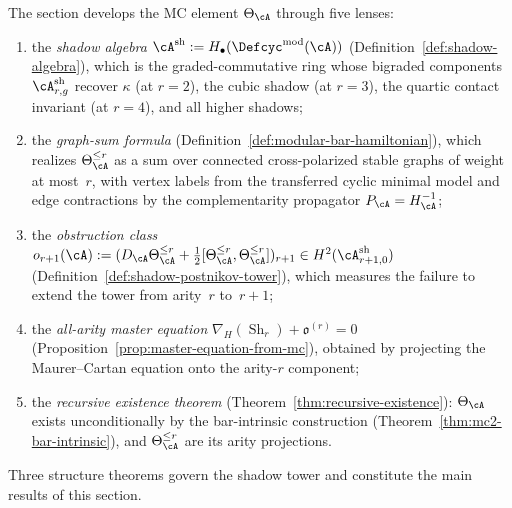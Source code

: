 The section develops the MC element $\Theta_\cA$ through five lenses:
\begin{enumerate}[label=\textup{(\arabic*)}]
\item the \emph{shadow algebra}
  $\cA^{\mathrm{sh}} := H_\bullet(\Defcyc^{\mathrm{mod}}(\cA))$
  (Definition~\ref{def:shadow-algebra}), which is the
  graded-commutative ring whose bigraded components
  $\cA^{\mathrm{sh}}_{r,g}$ recover $\kappa$ (at $r{=}2$),
  the cubic shadow (at $r{=}3$), the quartic contact invariant
  (at $r{=}4$), and all higher shadows;
\item the \emph{graph-sum formula}
  (Definition~\ref{def:modular-bar-hamiltonian}), which realizes
  $\Theta_\cA^{\leq r}$ as a sum over connected cross-polarized
  stable graphs of weight at most~$r$, with vertex labels from the
  transferred cyclic minimal model and edge contractions by the
  complementarity propagator $P_\cA = H_\cA^{-1}$;
\item the \emph{obstruction class}
  $o_{r+1}(\cA) :=
  (D_\cA\Theta_\cA^{\leq r}
  + \tfrac12[\Theta_\cA^{\leq r},\Theta_\cA^{\leq r}])_{r+1}
  \in H^2(\cA^{\mathrm{sh}}_{r+1,0})$
  (Definition~\ref{def:shadow-postnikov-tower}), which measures
  the failure to extend the tower from arity~$r$ to~$r{+}1$;
\item the \emph{all-arity master equation}
  $\nabla_H(\operatorname{Sh}_r) + \mathfrak{o}^{(r)} = 0$
  (Proposition~\ref{prop:master-equation-from-mc}), obtained by
  projecting the Maurer--Cartan equation onto the
  arity-$r$ component;
\item the \emph{recursive existence theorem}
  (Theorem~\ref{thm:recursive-existence}):
  $\Theta_\cA$ exists unconditionally by the bar-intrinsic
  construction (Theorem~\ref{thm:mc2-bar-intrinsic}), and
  $\Theta_\cA^{\leq r}$ are its arity projections.
\end{enumerate}
Three structure theorems govern the shadow tower and constitute the
main results of this section.
